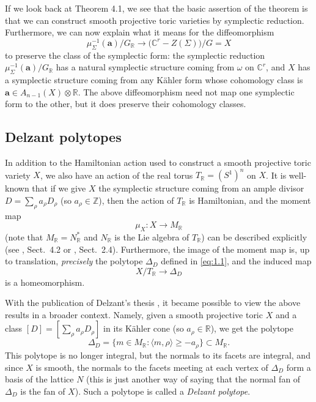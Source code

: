 \documentclass{amsart}
\theoremstyle{plain}
\theoremstyle{definition}
\begin{document}
	If we look back at Theorem 4.1, we see that the basic
assertion of the theorem is that we can construct smooth projective
toric varieties by symplectic reduction.  Furthermore, we can now
explain what it means for the diffeomorphism
\[
\mu_\Sigma^{-1}(\mathbf{a})/G_{\mathbb{R}} \longrightarrow \big(\mathbb{C}^r
- Z(\Sigma)\big)/G = X
\]
to preserve the class of the symplectic form: the symplectic reduction
$\mu_\Sigma^{-1}(\mathbf{a})/G_{\mathbb{R}}$ has a natural symplectic
structure coming from $\omega$ on $\mathbb{C}^r$, and $X$ has a
symplectic structure coming from any K\"ahler form whose cohomology
class is $\mathbf{a} \in A_{n-1}(X)\otimes\mathbb{R}$.  The above
diffeomorphism need not map one symplectic form to the other, but it
does preserve their cohomology classes.

	\subsection{Delzant polytopes} In addition to the
Hamiltonian action used to construct a smooth projective toric variety
$X$, we also have an action of the real torus $T_{\mathbb{R}} = (S^1)^n$
on $X$.  It is well-known that if we give $X$ the symplectic structure
coming from an ample divisor $D = \sum_\rho a_\rho D_\rho$ (so $a_\rho
\in \mathbb{Z}$), then the action of $T_{\mathbb{R}}$ is Hamiltonian, and
the moment map
\[
\mu_X : X \longrightarrow M_{\mathbb{R}}
\]
(note that $M_{\mathbb{R}} = N^*_{\mathbb{R}}$ and $N_{\mathbb{R}}$ is the
Lie algebra of $T_{\mathbb{R}}$) can be described explicitly (see
\cite{Ful}, Sect.~4.2 or \cite{Oda1}, Sect.~2.4).
Furthermore, the image of the moment map is, up to translation, {\it
precisely\/} the polytope $\Delta_D$ defined in \eqref{eq:1.1}, and the
induced map
\[
X/T_{\mathbb{R}} \longrightarrow \Delta_D
\]
is a homeomorphism.

	With the publication of Delzant's thesis \cite{Del}, it became
possible to view the above results in a broader context.  Namely, given
a smooth projective toric $X$ and a class $[D] = [\sum_\rho a_\rho
D_\rho]$ in its K\"ahler cone (so $a_\rho \in \mathbb{R}$), we get the
polytope 
\[
\Delta_D = \{m \in M_{\mathbb{R}}: \langle m,\rho\rangle \ge -a_\rho\}
\subset M_{\mathbb{R}}.
\]
This polytope is no longer integral, but the normals to its facets are
integral, and since $X$ is smooth, the normals to the facets meeting
at each vertex of $\Delta_D$ form a basis of the lattice $N$ (this is
just another way of saying that the normal fan of $\Delta_D$ is the
fan of $X$).  Such a polytope is called a {\it Delzant polytope\/}.
\end{document}
